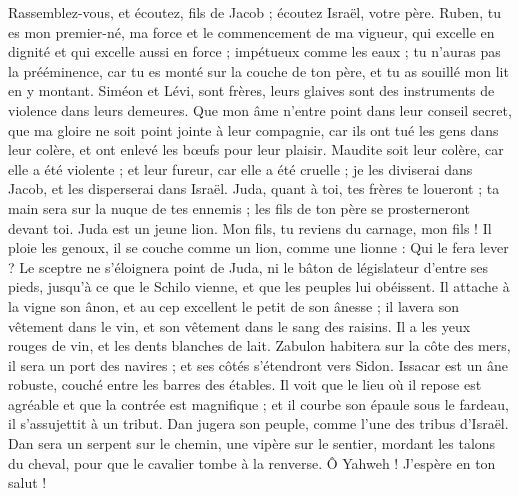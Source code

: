 \begin{multicols}{2}
Rassemblez-vous, et écoutez, fils de Jacob ; écoutez Israël, votre père.
Ruben, tu es mon premier-né, ma force et le commencement de ma vigueur, qui excelle en dignité et qui excelle aussi en force ;
impétueux comme les eaux ; tu n'auras pas la prééminence, car tu es monté sur la couche de ton père, et tu as souillé mon lit en y montant.
Siméon et Lévi, sont frères, leurs glaives sont des instruments de violence dans leurs demeures.
Que mon âme n'entre point dans leur conseil secret, que ma gloire ne soit point jointe à leur compagnie, car ils ont tué les gens dans leur colère, et ont enlevé les bœufs pour leur plaisir.
Maudite soit leur colère, car elle a été violente ; et leur fureur, car elle a été cruelle ; je les diviserai dans Jacob, et les disperserai dans Israël.
Juda, quant à toi, tes frères te loueront ; ta main sera sur la nuque de tes ennemis ; les fils de ton père se prosterneront devant toi.
Juda est un jeune lion. Mon fils, tu reviens du carnage, mon fils ! Il ploie les genoux, il se couche comme un lion, comme une lionne : Qui le fera lever ?
Le sceptre ne s’éloignera point de Juda, ni le bâton de législateur d'entre ses pieds, jusqu'à ce que le Schilo vienne, et que  les peuples lui obéissent.
Il attache à la vigne son ânon, et au cep excellent le petit de son ânesse ; il lavera son vêtement dans le vin, et son vêtement dans le sang des raisins.
Il a les yeux rouges de vin, et les dents blanches de lait.
Zabulon habitera sur la côte des mers, il sera un port des navires ; et ses côtés s'étendront vers Sidon.
Issacar est un âne robuste, couché entre les barres des étables.
Il voit que le lieu où il repose est agréable et que la contrée est magnifique ; et il courbe son épaule sous le fardeau, il s’assujettit à un tribut.
Dan jugera son peuple, comme l’une des tribus d'Israël.
Dan sera un serpent sur le chemin, une vipère sur le sentier, mordant les talons du cheval, pour que le cavalier tombe à la renverse.
Ô Yahweh ! J’espère en ton salut !

\end{multicols}
